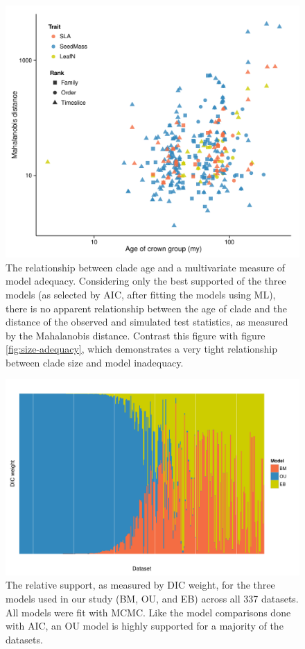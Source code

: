 \documentclass[a4paper,11pt]{article}
\begin{document}
{\begin{figure}[p]
  \centering
  \includegraphics[scale=0.8]{figs/ad-age-ml}
  \caption{The relationship between clade age and a multivariate measure of model adequacy. Considering only the best supported of the three models (as selected by AIC, after fitting the models using ML), there is no  apparent relationship between the age of clade and the distance of the observed and simulated test statistics, as measured by the Mahalanobis distance. Contrast this figure with figure \ref{fig:size-adequacy}, which demonstrates a very tight relationship between clade size and model inadequacy.}
  \label{fig:supp-age-ml}
\end{figure}

\begin{figure}[p]
  \centering
  \includegraphics[angle=90, origin=c, scale=0.8]{figs/dic-support}
  \caption{The relative support, as measured by DIC weight, for the three models used in our study (BM, OU, and EB) across all 337 datasets. All models were fit with MCMC. Like the model comparisons done with AIC, an OU model is highly supported for a majority of the datasets.}
  \label{fig:supp-dic-support}
\end{figure}

}
\end{document}
